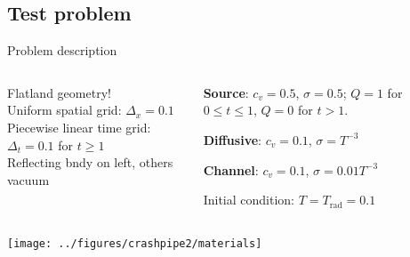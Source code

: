 \documentclass{beamer}
\begin{document}
\subsection{Test problem}
\begin{frame}{Problem description}
  \begin{columns}[t]
    \begin{column}{.48\textwidth}
      Flatland geometry!
      \\Uniform spatial grid: $\Delta_x=0.1$
      \\Piecewise linear time grid: $\Delta_t=0.1$ for $t \ge 1$
      \\Reflecting bndy on left, others vacuum
    \end{column}
    \begin{column}{.48\textwidth}
      \textcolor[rgb]{0,0,1}{\textbf{Source}}: $c_v=0.5$, $\sigma=0.5$;
      $Q=1$ for $0 \le t \le 1$, $Q=0$ for $t > 1$.

      \textcolor[rgb]{1,0,0}{\textbf{Diffusive}}: $c_v=0.1$,
      $\sigma=T^{-3}$

      \textcolor[rgb]{0.1,0.9,0.1}{\textbf{Channel}}: $c_v=0.1$,
      $\sigma=0.01 T^{-3}$

      Initial condition: $T=T_\text{rad}=0.1$
    \end{column}
  \end{columns}
\begin{center}
  \texttt{[image: ../figures/crashpipe2/materials]}
\end{center}
\end{frame}
\end{document}
